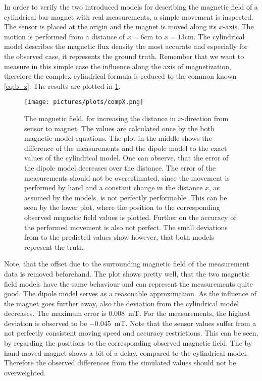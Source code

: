 In order to verify the two introduced models for describing the magnetic field of a cylindrical bar magnet with real measurements, a simple movement is inspected. The sensor is placed at the origin and the magnet is moved along its $ x $-axis. The motion is performed from a distance of $ x=6\si{\cm} $ to $ x=13\si{\cm} $. The cylindrical model describes the magnetic flux density the most accurate and especially for the observed case, it represents the ground truth. Remember that we want to measure in this simple case the influence along the axis of magnetization, therefore the complex cylindrical formula is reduced to the common known \ref{eq:b_z}. The results are plotted in \ref{fig:modCompFlat}.
\begin{figure}[!htb]
\centering
\texttt{[image: pictures/plots/compX.png]}
\caption[Comparing the models and sensor measurements for flat movement]
{The magnetic field, for increasing the distance in $ x $-direction from sensor to magnet. The values are calculated once by the both magnetic model equations. The plot in the middle shows the difference of the measurements and the dipole model to the exact values of the cylindrical model. One can observe, that the error of the dipole model decreases over the distance. The error of the measurements should not be overestimated, since the movement is performed by hand and a constant change in the distance $ x $, as assumed by the models, is not perfectly performable. This can be seen by the lower plot, where the position to the corresponding observed magnetic field values is plotted. Further on the accuracy of the performed movement is also not perfect. The small deviations from to the predicted values show however, that both models represent the truth.}
\label{fig:modCompFlat}
\end{figure}
Note, that the offset due to the surrounding magnetic field of the measurement data is removed beforehand. The plot shows pretty well, that the two magnetic field models have the same behaviour and can represent the measurements quite good. The dipole model serves as a reasonable approximation. As the influence of the magnet goes further away, also the deviation from the cylindrical model decreases. The maximum error is \SI{0.008}{\milli \tesla}. For the measurements, the highest deviation is observed to be \SI{-0.045}{\milli \tesla}. Note that the sensor values suffer from a not perfectly consistent moving speed and accuracy restrictions. This can be seen, by regarding the positions to the corresponding observed magnetic field. The by hand moved magnet shows a bit of a \grqq delay\grqq, compared to the cylindrical model. Therefore the observed differences from the simulated values should not be overweighted.




